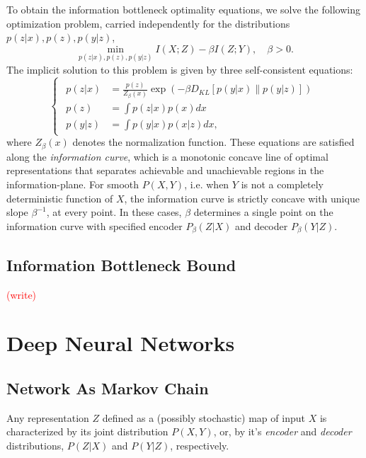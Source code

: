 \documentclass[11pt]{article}
\newcommand\myworries[1]{\textcolor{red}{(#1)}}
\begin{document}
To obtain the information bottleneck optimality equations, we solve the following optimization problem, carried independently for the distributions $p(z\vert x), p(z), p(y\vert z)$,
\begin{equation}
\underset{p(z\vert x), p(z), p(y\vert z)}{\min} I(X;Z) - \beta I(Z;Y), \quad\beta>0.
\end{equation}
The implicit solution to this problem is given by three self-consistent equations:
\begin{equation}
\begin{cases}
\begin{array}{rl}
p(z\vert x) & =\frac{p(z)}{Z_{\beta}(x)}\exp\left(-\beta D_{KL}\left[p(y\vert x)\rVert p(y\vert z)\right]\right)\\
p(z) & =\int p(z\vert x)p(x)dx\\
p(y\vert z) & =\int p(y\vert x)p(x\vert z)dx,
\end{array}
\end{cases}
\end{equation}
where $Z_\beta(x)$ denotes the normalization function. These equations are satisfied along the \emph{information curve}, which is a monotonic concave line of optimal representations that separates achievable and unachievable regions in the information-plane. For smooth $P(X,Y)$, i.e. when $Y$ is not a completely deterministic function of $X$, the information curve is strictly concave with unique slope $\beta^{-1}$, at every point.  In these cases, $\beta$ determines a single point on the information curve with specified encoder $P_\beta(Z\vert X)$ and decoder $P_\beta(Y\vert Z)$.

\subsection*{Information Bottleneck Bound}

\myworries{write}

\section{Deep Neural Networks}

\subsection*{Network As Markov Chain}

Any representation $Z$ defined as a (possibly stochastic) map of input $X$ is characterized by its joint distribution $P(X,Y)$, or, by it's \emph{encoder} and \emph{decoder} distributions, $P(Z \vert X)$ and $P(Y \vert Z)$, respectively.
\end{document}
